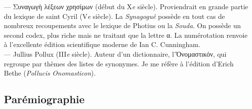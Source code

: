 \documentclass{book}%
\newcommand{\italique}[1]{\textit{#1}}%
\newcommand{\nieme}[1]{#1\italique{e}}%
\newcommand{\sousPartie}[1]{\subsection*{#1}}%
\begin{document}
--- Συναγωγὴ λέξεων χρησίμων (début du \nieme{X} siècle). Proviendrait en grande partie du lexique de saint Cyril (\nieme{V} siècle). La \italique{Synagoguê} possède en tout cas de nombreux recoupements avec le lexique de Photius ou la \italique{Souda}. On possède un second codex, plus riche mais ne traitant que la lettre α. La numérotation renvoie à l'excellente édition scientifique moderne de Ian C. Cunningham.\\

--- Jullius Pollux (\nieme{III} siècle). Auteur d'un dictionnaire, l'Ὀνομαστικόν, qui regroupe par thèmes des listes de synonymes. Je me réfère à l'édition d'Erich Bethe (\italique{Pollucis Onomasticon}).\\


\sousPartie{Parémiographie}
\end{document}
